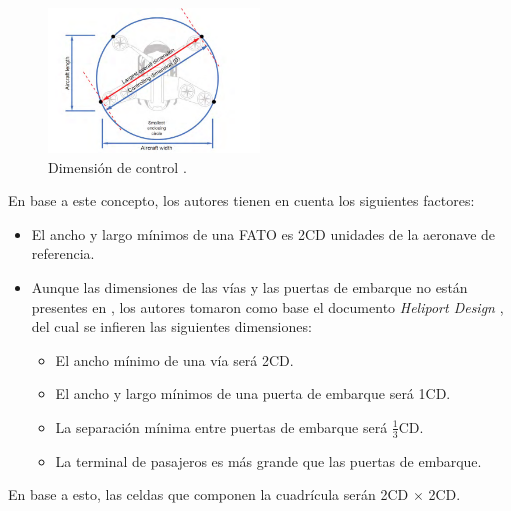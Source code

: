 \documentclass[12pt,a4paper]{book}
\begin{document}
\begin{figure}[h]
    \begin{center}
    \includegraphics[width=0.5\textwidth]{img/unidad_CD.png}
    \end{center}
    \caption{Dimensión de control \cite{federal_aviation_administration_vertiport_2022}.}
    \label{fig:def_unidad_cd}
\end{figure} 

En base a este concepto, los autores tienen en cuenta los siguientes factores:

\begin{itemize}
			\item El ancho y largo mínimos de una FATO es 2CD unidades de la aeronave de referencia. 
			\item Aunque las dimensiones de las vías y las puertas de embarque no están presentes en \cite{federal_aviation_administration_vertiport_2022}, los autores tomaron como base el documento \textsl{Heliport Design} \cite{administration_heliport_2012}, del cual se infieren las siguientes dimensiones: 
				\begin{itemize}
					\item El ancho mínimo de una vía será 2CD.
					\item El ancho y largo mínimos de una puerta de embarque será 1CD.
					\item La separación mínima entre puertas de embarque será $\frac{1}{3}$CD. 
					\item La terminal de pasajeros es más grande que las puertas de embarque.
				\end{itemize}
		\end{itemize}
En base a esto, las celdas que componen la cuadrícula serán 2CD $\times$ 2CD. 
\end{document}
